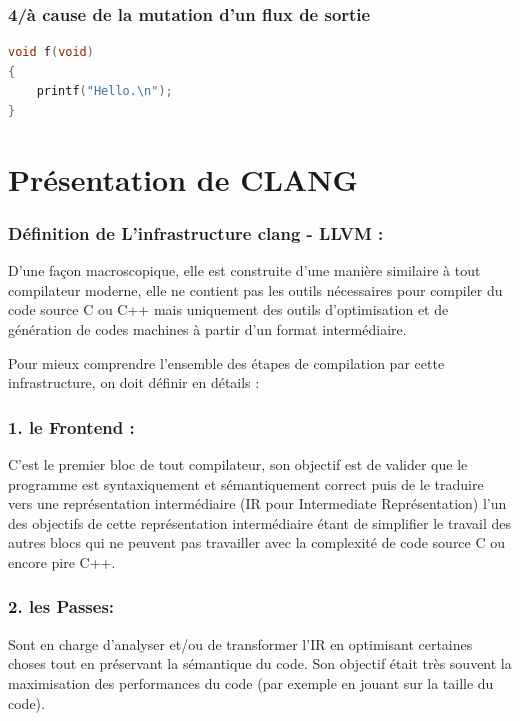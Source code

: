 \documentclass[12pt,titlepage]{article}
\begin{document}
\subsubsection {4/à cause de la mutation d'un flux de sortie}

\begin{lstlisting}[language=c]
void f(void)
{
    printf("Hello.\n");
}
\end{lstlisting}

\section{Présentation de CLANG} 


\subsubsection{ Définition de  L’infrastructure clang - LLVM :}

D’une façon macroscopique, elle est construite d’une manière similaire à tout compilateur moderne, elle ne contient pas les outils nécessaires pour compiler du code source C ou C++ mais uniquement des outils d’optimisation et de génération de codes machines à partir d’un format intermédiaire.
      
      Pour mieux comprendre l’ensemble des étapes de compilation par cette infrastructure,   on doit définir en détails :
       
     \subsubsection{ 1. le Frontend : }
     C'est le premier bloc de tout compilateur, son objectif est de valider que le programme est syntaxiquement et sémantiquement correct puis de le traduire vers une représentation intermédiaire (IR pour Intermediate Représentation) l'un des objectifs de cette représentation intermédiaire étant de simplifier le travail des autres blocs qui ne peuvent pas travailler avec la complexité de code source C ou encore pire C++. 

     \subsubsection{2. les Passes: }
     Sont en charge d’analyser et/ou de transformer l’IR en optimisant certaines choses tout en préservant la sémantique du code. Son objectif était très souvent la maximisation des performances du code (par exemple en jouant sur la taille du code).
\end{document}
